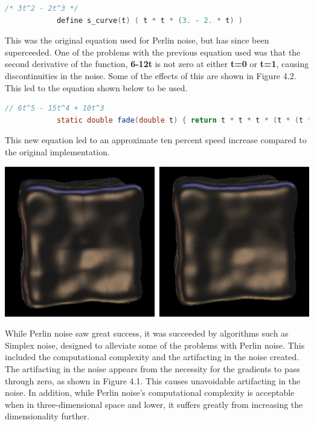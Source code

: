 \documentclass[10pt]{report}
\begin{document}
		\begin{lstlisting}[language=C]
			/* 3t^2 - 2t^3 */
			define s_curve(t) ( t * t * (3. - 2. * t) )
		\end{lstlisting}
		
		This was the original equation used for Perlin noise, but has since been superceeded. One of the problems with the previous equation used was that the second derivative of the function, \textbf{6-12t} is not zero at either \textbf{t=0} or \textbf{t=1}, causing discontinuities in the noise. Some of the effects of this are shown in Figure 4.2. This led to the equation shown below to be used. 
		
		\begin{lstlisting}[language=Java]
			// 6t^5 - 15t^4 + 10t^3
			static double fade(double t) { return t * t * t * (t * (t * 6 - 15) + 10); }
		\end{lstlisting}
		
		This new equation led to an approximate ten percent speed increase compared to the original implementation. 
		
		\begin{minipage}{\textwidth}
			\centering
			\includegraphics[scale=.5]{s-curve}
			\label{fig:fig6}
		\end{minipage} 
		
		While Perlin noise saw great success, it was succeeded by algorithms such as Simplex noise, designed to alleviate some of the problems with Perlin noise. This included the computational complexity and the artifacting in the noise created. The artifacting in the noise appears from the necessity for the gradients to pass through zero, as shown in Figure 4.1. This causes unavoidable artifacting in the noise. In addition, while Perlin noise's computational complexity is acceptable when in three-dimensional space and lower, it suffers greatly from increasing the dimensionality further.
	
\end{document}
